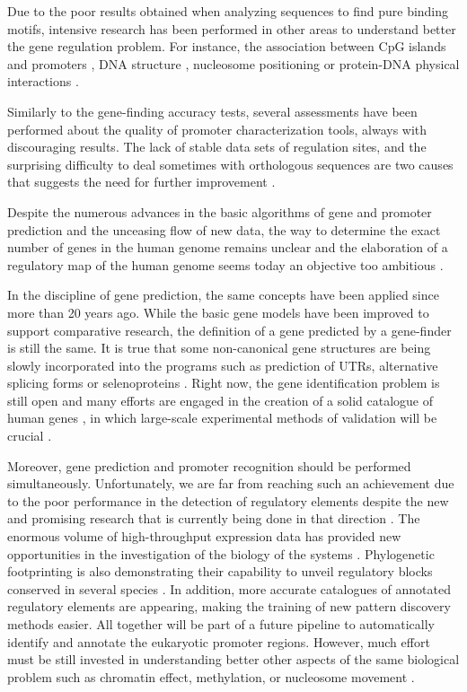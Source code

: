 Due to the poor results obtained when analyzing sequences to find pure binding motifs, intensive research 
has been performed in other areas to understand better the gene regulation problem. For instance, the 
association between CpG islands and promoters \citep{cuadrado:2001a}, DNA structure \citep{pedersen:1998a}, 
nucleosome positioning \citep{ioshikhes:1999a} or protein-DNA physical interactions \citep{halford:2004a}.

Similarly to the gene-finding accuracy tests, several assessments have been performed about the
quality of promoter characterization tools, always with discouraging results. The lack of stable
data sets of regulation sites, and the surprising difficulty to deal sometimes with orthologous sequences
are two causes that suggests the need for further improvement \citep{prakash:2005a,tompa:2005a}.


Despite the numerous advances in the basic algorithms of gene and promoter 
prediction and the unceasing flow of new data, the way to determine the exact number of 
genes in the human genome remains unclear \citep{pennisi:2003a} and the elaboration of a 
regulatory map of the human genome seems today an objective too ambitious \citep{wasserman:2004a}.

In the discipline of gene prediction, the same concepts have been applied since more than 20 years
ago. While the basic gene models have been improved to support comparative research, the definition
of a gene predicted by a gene-finder is still the same. It is true that some non-canonical gene 
structures are being slowly incorporated into the programs such as prediction of UTRs, alternative
splicing forms or selenoproteins \citep{brent:2004a}. Right now, the gene identification problem is 
still open and many efforts are engaged in the creation of a solid catalogue of human genes 
\citep{encode:2004a}, in which large-scale experimental methods of validation will be crucial \citep{brent:2005a}. 

Moreover, gene prediction and promoter recognition should be performed simultaneously. Unfortunately, 
we are far from reaching such an achievement due to the poor performance in the detection of regulatory elements 
despite the new and promising research that is currently being done in that direction \citep{pennacchio:2001a}.
The enormous volume of high-throughput expression data has provided new opportunities in the investigation of
the biology of the systems \citep{davidson:2002a}. Phylogenetic footprinting is also demonstrating their
capability to unveil regulatory blocks conserved in several species \citep{wasserman:2000a}. In addition, more accurate
catalogues of annotated regulatory elements are appearing, making the training of new pattern discovery methods
easier. All together will be part of a future pipeline to automatically identify and annotate the eukaryotic promoter 
regions. However, much effort must be still invested in understanding better other aspects of the same biological problem 
such as chromatin effect, methylation, or nucleosome movement \citep{pedersen:1999a}.


